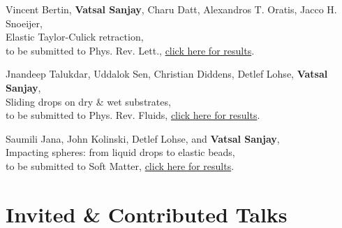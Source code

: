 \documentclass[10pt,a4paper,colorlinks,linkcolor=blue,urlcolor=blue,citecolor=blue]{moderncv}
\begin{document}
\begin{enumerate}[leftmargin=1.5em,label=\textbf{[\arabic*]}]
	\item Vincent Bertin, \textbf{Vatsal Sanjay}, Charu Datt, Alexandros T. Oratis, Jacco H. Snoeijer,\\
	Elastic Taylor-Culick retraction,\\
	to be submitted to Phys. Rev. Lett., \href{https://tinyurl.com/2cvo89bd}{click here for results}.

	\item Jnandeep Talukdar, Uddalok Sen, Christian Diddens, Detlef Lohse, \textbf{Vatsal Sanjay},\\
	Sliding drops on dry \& wet substrates,\\
	to be submitted to Phys. Rev. Fluids, \href{https://tinyurl.com/2xvlhlc6}{click here for results}.

	\item Saumili Jana, John Kolinski, Detlef Lohse, and \textbf{Vatsal Sanjay},\\
	Impacting spheres: from liquid drops to elastic beads,\\
	to be submitted to Soft Matter, \href{https://tinyurl.com/28s25jvf}{click here for results}.

\end{enumerate}

\section{Invited \& Contributed Talks}
\end{document}
